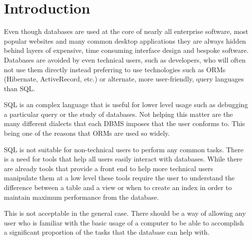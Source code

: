 \chapter{Introduction}

Even though databases are used at the core of nearly all enterprise software,
most popular websites and many common desktop applications they are always
hidden behind layers of expensive, time consuming interface design and bespoke
software. Databases are avoided by even technical users, such as developers,
who will often not use them directly instead preferring to use technologies
such as \acp{ORM} (Hibernate, ActiveRecord, etc.) or alternate, more
user-friendly, query languages than \ac{SQL}.

\ac{SQL} is an complex language that is useful for lower level usage such as
debugging a particular query or the study of databases. Not helping this matter
are the many different dialects that each \ac{DBMS} imposes that the user
conforms to. This being one of the reasons that \acp{ORM} are used so widely.

\ac{SQL} is not suitable for non-technical users to perform any common tasks.
There is a need for tools that help all users easily interact with databases.
While there are already tools that provide a front end to help more technical
users manipulate them at a low level these tools require the user to understand
the difference between a table and a view or when to create an index in order
to maintain maximum performance from the database.

This is not acceptable in the general case. There should be a way of allowing
any user who is familiar with the basic usage of a computer to be able to
accomplish a significant proportion of the tasks that the database can help with.
